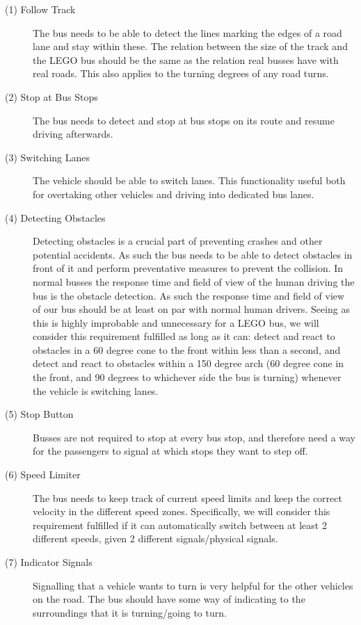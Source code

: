\begin{description}
    \item [(1) Follow Track]
    The bus needs to be able to detect the lines marking the edges of a road lane and stay within these. The relation between the size of the track and the LEGO bus should be the same as the relation real busses have with real roads. This also applies to the turning degrees of any road turns. 
    
    \item[(2) Stop at Bus Stops]
    The bus needs to detect and stop at bus stops on its route and resume driving afterwards. 

    \item[(3) Switching Lanes] 
    The vehicle should be able to switch lanes. This functionality useful both for overtaking other vehicles and driving into dedicated bus lanes. 
    
    \item[(4) Detecting Obstacles]
    Detecting obstacles is a crucial part of preventing crashes and other potential accidents. As such the bus needs to be able to detect obstacles in front of it and perform preventative measures to prevent the collision. In normal busses the response time and field of view of the human driving the bus is the obstacle detection.  As such the response time and field of view of our bus should be at least on par with normal human drivers. Seeing as this is highly improbable and unnecessary for a LEGO bus, we will consider this requirement fulfilled as long as it can: detect and react to obstacles in a 60 degree cone to the front within less than a second, and detect and react to obstacles within a 150 degree arch (60 degree cone in the front, and 90 degrees to whichever side the bus is turning) whenever the vehicle is switching lanes. 
    
    \item[(5) Stop Button]
    Busses are not required to stop at every bus stop, and therefore need a way for the passengers to signal at which stops they want to step off. 
    
    \item[(6) Speed Limiter]
    The bus needs to keep track of current speed limits and keep the correct velocity in the different speed zones. Specifically, we will consider this requirement fulfilled if it can automatically switch between at least 2 different speeds, given 2 different signals/physical signals.
    
    \item[(7) Indicator Signals]
    Signalling that a vehicle wants to turn is very helpful for the other vehicles on the road. The bus should have some way of indicating to the surroundings that it is turning/going to turn.
    
\end{description}

